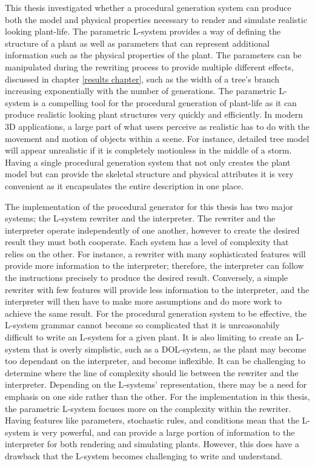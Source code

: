 \lettrine[lines=3]{T}{}his thesis investigated whether a procedural generation system can produce both the model and physical properties necessary to render and simulate realistic looking plant-life. The parametric L-system provides a way of defining the structure of a plant as well as parameters that can represent additional information such as the physical properties of the plant. The parameters can be manipulated during the rewriting process to provide multiple different effects, discussed in chapter \ref{results chapter}, such as the width of a tree's branch increasing exponentially with the number of generations. The parametric L-system is a compelling tool for the procedural generation of plant-life as it can produce realistic looking plant structures very quickly and efficiently. In modern 3D applications, a large part of what users perceive as realistic has to do with the movement and motion of objects within a scene. For instance, detailed tree model will appear unrealistic if it is completely motionless in the middle of a storm. Having a single procedural generation system that not only creates the plant model but can provide the skeletal structure and physical attributes it is very convenient as it encapsulates the entire description in one place.

The implementation of the procedural generator for this thesis has two major systems; the L-system rewriter and the interpreter. The rewriter and the interpreter operate independently of one another, however to create the desired result they must both cooperate. Each system has a level of complexity that relies on the other. For instance, a rewriter with many sophisticated features will provide more information to the interpreter; therefore, the interpreter can follow the instructions precisely to produce the desired result. Conversely, a simple rewriter with few features will provide less information to the interpreter, and the interpreter will then have to make more assumptions and do more work to achieve the same result. For the procedural generation system to be effective, the L-system grammar cannot become so complicated that it is unreasonabily difficult to write an L-system for a given plant. It is also limiting to create an L-system that is overly simplistic, such as a DOL-system, as the plant may become too dependant on the interpreter, and become inflexible. It can be challenging to determine where the line of complexity should lie between the rewriter and the interpreter. Depending on the L-systems' representation, there may be a need for emphasis on one side rather than the other. For the implementation in this thesis, the parametric L-system focuses more on the complexity within the rewriter. Having features like parameters, stochastic rules, and conditions mean that the L-system is very powerful, and can provide a large portion of information to the interpreter for both rendering and simulating plants. However, this does have a drawback that the L-system becomes challenging to write and understand.

